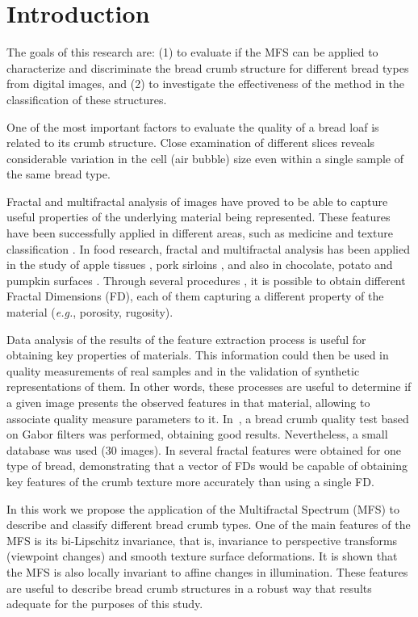 \section{Introduction}
\label{intro}
The goals of this research are: (1) to evaluate if the MFS \cite{Xu2009} can be applied to characterize and discriminate the bread crumb structure for different bread types from digital images, and (2) to investigate the effectiveness of the method in the classification of these structures.

One of the most important factors to evaluate the quality of a bread loaf is related to its crumb structure. Close examination of different slices reveals considerable variation in the cell (air bubble) size even within a single sample of the same bread type. 

Fractal and multifractal analysis of images have pro\-ved to be able to capture useful properties of the underlying material being represented. These features have been successfully applied in different areas, such as medi\-cine \cite{Andjelkovic2008,Yu2011} and texture classification \cite{Wendt2009}. In food research, fractal and multifractal analysis has been applied in the study of apple tissues \cite{Mendoza2010}, pork sirloins \cite{Serrano2012}, and also in chocolate, potato and pumpkin surfaces \cite{Quevedo2002}. Through several procedures \cite{Peitgen2004,Gonzales2008}, it is possible to obtain different Fractal Dimensions (FD), each of them capturing a different property of the material ({\em e.g.}, porosity, rugosity).

Data analysis of the results of the feature extraction process is useful for obtaining key properties of materials. This information could then be used in quality measurements of real samples and in the validation of synthetic representations of them. In other words, these processes are useful to determine if a given image presents the observed features in that material, allowing to associate quality measure parameters to it. In~\cite{Fan2006}, a bread crumb quality test based on Gabor filters was performed, obtaining good results. Nevertheless, a small database was used ($30$ images). In \cite{Gonzales2008} several fractal features were obtained for one type of bread, demonstrating that a vector of FDs would be capable of obtaining key features of the crumb texture more accurately than using a single FD.

In this work we propose the application of the Multifractal Spectrum (MFS) to describe and classify different bread crumb types. One of the main features of the MFS is its bi-Lipschitz invariance, that is, invariance to perspective transforms (viewpoint changes) and smooth texture surface deformations. It is shown that the MFS is also locally invariant to affine changes in illumination. These features are useful to describe bread crumb structures in a robust way that results adequate for the purposes of this study.

